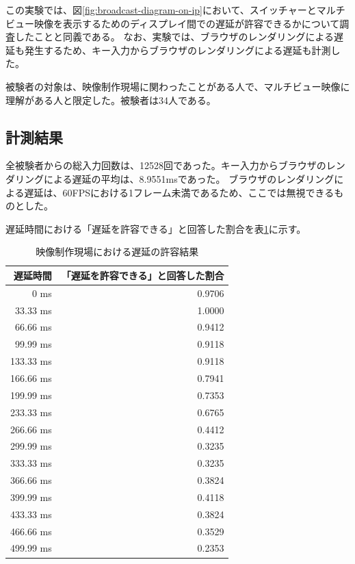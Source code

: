 この実験では、図\ref{fig:broadcast-diagram-on-ip}において、スイッチャーとマルチビュー映像を表示するためのディスプレイ間での遅延が許容できるかについて調査したことと同義である。
なお、実験では、ブラウザのレンダリングによる遅延も発生するため、キー入力からブラウザのレンダリングによる遅延も計測した。

被験者の対象は、映像制作現場に関わったことがある人で、マルチビュー映像に理解がある人と限定した。被験者は34人である。

\newpage
\subsection{計測結果}

全被験者からの総入力回数は、12528回であった。キー入力からブラウザのレンダリングによる遅延の平均は、8.9551msであった。
ブラウザのレンダリングによる遅延は、60FPSにおける1フレーム未満であるため、ここでは無視できるものとした。

遅延時間における「遅延を許容できる」と回答した割合を表\ref{tb:mv-delay-result}に示す。

\begin{table}[htbp]
  \caption{映像制作現場における遅延の許容結果}
  \label{tb:mv-delay-result}
  \begin{center}
  \begin{tabular}{r|r}
    \hline
    遅延時間   & 「遅延を許容できる」と回答した割合 \\\hline\hline
    0 ms      & 0.9706 \\\hline
    33.33 ms  & 1.0000         \\\hline
    66.66 ms  & 0.9412 \\\hline
    99.99 ms  & 0.9118 \\\hline
    133.33 ms & 0.9118 \\\hline
    166.66 ms & 0.7941 \\\hline
    199.99 ms & 0.7353  \\\hline
    233.33 ms & 0.6765 \\\hline
    266.66 ms & 0.4412 \\\hline
    299.99 ms & 0.3235 \\\hline
    333.33 ms & 0.3235 \\\hline
    366.66 ms & 0.3824 \\\hline
    399.99 ms & 0.4118 \\\hline
    433.33 ms & 0.3824 \\\hline
    466.66 ms & 0.3529 \\\hline
    499.99 ms & 0.2353 \\\hline
  \end{tabular}\end{center}
\end{table}


